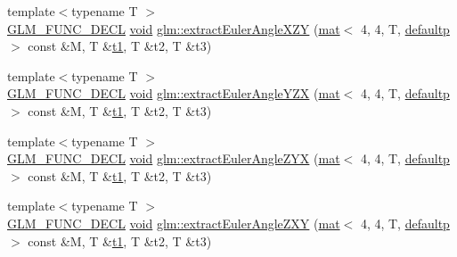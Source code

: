 \begin{DoxyCompactItemize}
\item 
{\footnotesize template$<$typename T $>$ }\\\mbox{\hyperlink{setup_8hpp_ab2d052de21a70539923e9bcbf6e83a51}{G\+L\+M\+\_\+\+F\+U\+N\+C\+\_\+\+D\+E\+CL}} \mbox{\hyperlink{_s_d_l__opengles2__gl2ext_8h_ae5d8fa23ad07c48bb609509eae494c95}{void}} \mbox{\hyperlink{group__gtx__euler__angles_gabe5a65d8eb1cd873c8de121cce1a15ed}{glm\+::extract\+Euler\+Angle\+X\+ZY}} (\mbox{\hyperlink{structglm_1_1mat}{mat}}$<$ 4, 4, T, \mbox{\hyperlink{namespaceglm_a36ed105b07c7746804d7fdc7cc90ff25a9d21ccd8b5a009ec7eb7677befc3bf51}{defaultp}} $>$ const \&M, T \&\mbox{\hyperlink{_s_d_l__opengl__glext_8h_af48031a37b713afa3b0d0d7d29653d7c}{t1}}, T \&t2, T \&t3)
\item 
{\footnotesize template$<$typename T $>$ }\\\mbox{\hyperlink{setup_8hpp_ab2d052de21a70539923e9bcbf6e83a51}{G\+L\+M\+\_\+\+F\+U\+N\+C\+\_\+\+D\+E\+CL}} \mbox{\hyperlink{_s_d_l__opengles2__gl2ext_8h_ae5d8fa23ad07c48bb609509eae494c95}{void}} \mbox{\hyperlink{group__gtx__euler__angles_ga9049b78466796c0de2971756e25b93d3}{glm\+::extract\+Euler\+Angle\+Y\+ZX}} (\mbox{\hyperlink{structglm_1_1mat}{mat}}$<$ 4, 4, T, \mbox{\hyperlink{namespaceglm_a36ed105b07c7746804d7fdc7cc90ff25a9d21ccd8b5a009ec7eb7677befc3bf51}{defaultp}} $>$ const \&M, T \&\mbox{\hyperlink{_s_d_l__opengl__glext_8h_af48031a37b713afa3b0d0d7d29653d7c}{t1}}, T \&t2, T \&t3)
\item 
{\footnotesize template$<$typename T $>$ }\\\mbox{\hyperlink{setup_8hpp_ab2d052de21a70539923e9bcbf6e83a51}{G\+L\+M\+\_\+\+F\+U\+N\+C\+\_\+\+D\+E\+CL}} \mbox{\hyperlink{_s_d_l__opengles2__gl2ext_8h_ae5d8fa23ad07c48bb609509eae494c95}{void}} \mbox{\hyperlink{group__gtx__euler__angles_ga2d6c11a4abfa60c565483cee2d3f7665}{glm\+::extract\+Euler\+Angle\+Z\+YX}} (\mbox{\hyperlink{structglm_1_1mat}{mat}}$<$ 4, 4, T, \mbox{\hyperlink{namespaceglm_a36ed105b07c7746804d7fdc7cc90ff25a9d21ccd8b5a009ec7eb7677befc3bf51}{defaultp}} $>$ const \&M, T \&\mbox{\hyperlink{_s_d_l__opengl__glext_8h_af48031a37b713afa3b0d0d7d29653d7c}{t1}}, T \&t2, T \&t3)
\item 
{\footnotesize template$<$typename T $>$ }\\\mbox{\hyperlink{setup_8hpp_ab2d052de21a70539923e9bcbf6e83a51}{G\+L\+M\+\_\+\+F\+U\+N\+C\+\_\+\+D\+E\+CL}} \mbox{\hyperlink{_s_d_l__opengles2__gl2ext_8h_ae5d8fa23ad07c48bb609509eae494c95}{void}} \mbox{\hyperlink{group__gtx__euler__angles_ga81fbbca2ba0c778b9662d5355b4e2363}{glm\+::extract\+Euler\+Angle\+Z\+XY}} (\mbox{\hyperlink{structglm_1_1mat}{mat}}$<$ 4, 4, T, \mbox{\hyperlink{namespaceglm_a36ed105b07c7746804d7fdc7cc90ff25a9d21ccd8b5a009ec7eb7677befc3bf51}{defaultp}} $>$ const \&M, T \&\mbox{\hyperlink{_s_d_l__opengl__glext_8h_af48031a37b713afa3b0d0d7d29653d7c}{t1}}, T \&t2, T \&t3)
\end{DoxyCompactItemize}


